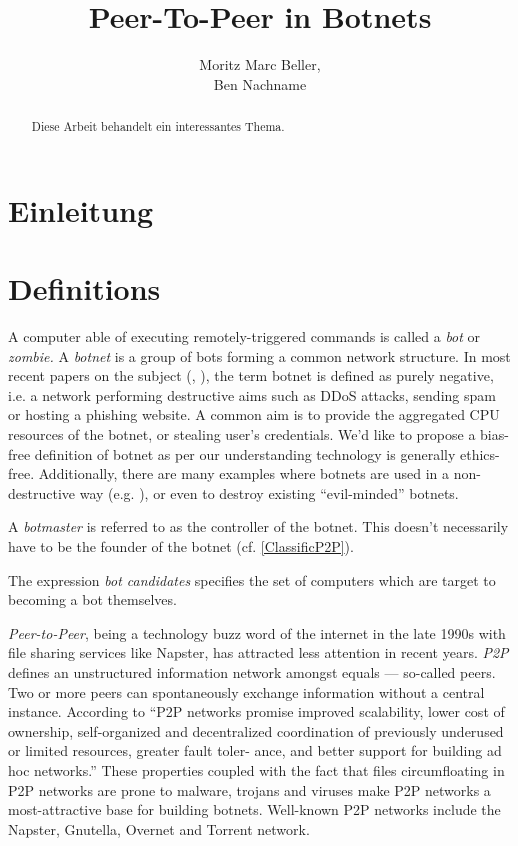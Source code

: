 \documentclass{llncs}
\title{Peer-To-Peer in Botnets}
\author{Moritz Marc Beller,\\Ben Nachname}
\institute{%
   Fakultät für Informatik, \\
   Technische Universität München \\
   \email{\{beller,bennachname\}@in.tum.de}
}
\begin{document}
\maketitle

\begin{abstract}
Diese Arbeit behandelt ein interessantes Thema.
\end{abstract}

\section{Einleitung}



\section{Definitions}
A computer able of executing remotely-triggered commands is called a
{\it bot} or {\it zombie.} A {\it botnet} is a group of bots forming a
common network structure.\cite{schoof2007detecting} In most recent
papers on the subject (\cite{wang2009systematic},
\cite{abu2006multifaceted}), the term botnet is defined as purely
negative, i.e. a network performing destructive aims such as DDoS
attacks, sending spam or hosting a phishing
website\cite{steggink2007detection}. A common aim is to provide the
aggregated CPU resources of the botnet, or stealing user's
credentials. \cite{borgaonkar2010analysis} We'd like to propose a
bias-free definition of botnet as per our understanding technology is
generally ethics-free. Additionally, there are many examples where
botnets are used in a non-destructive way (e.g. \cite{seti}), or even
to destroy existing ``evil-minded'' botnets.

A {\it botmaster} is referred to as the controller of the botnet. This
doesn't necessarily have to be the founder of the botnet (cf. \ref{ClassificP2P}).

The expression {\it bot candidates} specifies the set of computers
which are target to becoming a bot themselves.

{\it Peer-to-Peer}, being a technology buzz word of the internet in
the late 1990s with file sharing services like Napster\cite{napster},
has attracted less attention in recent years. {\it P2P } defines an
unstructured information network amongst equals --- so-called
peers. Two or more peers can spontaneously exchange information
without a central instance. According to \cite{schoder2005core} ``P2P
networks promise improved scalability, lower cost of ownership,
self-organized and decentralized coordination of previously underused
or limited resources, greater fault toler- ance, and better support
for building ad hoc networks.''  These properties coupled with the
fact that files circumfloating in P2P networks are prone to malware,
trojans and viruses make P2P networks a most-attractive base for
building botnets.  Well-known P2P networks include the
Napster\cite{napster}, Gnutella, Overnet and Torrent network.
\end{document}
